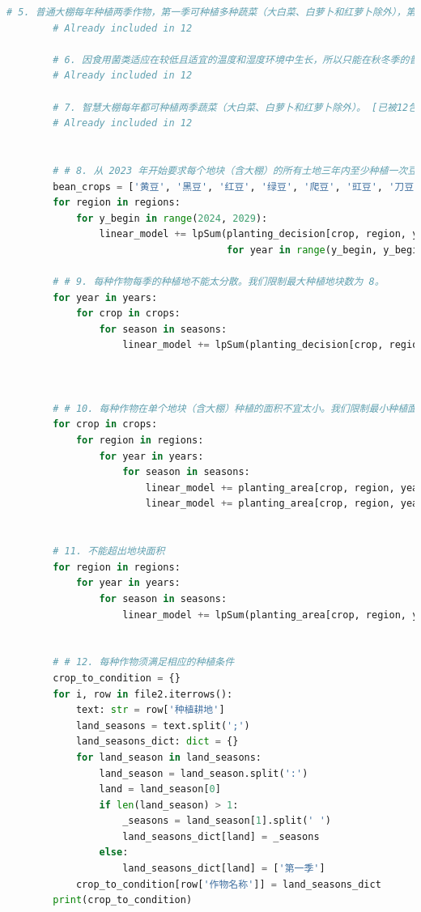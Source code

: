 \documentclass[withoutpreface]{cumcmthesis}
\begin{document}
\begin{appendices}
\begin{lstlisting}[language=python]
        # 5. 普通大棚每年种植两季作物，第一季可种植多种蔬菜（大白菜、白萝卜和红萝卜除外），第二季只能种植食用菌。[已被12包含]
        # Already included in 12
    
        # 6. 因食用菌类适应在较低且适宜的温度和湿度环境中生长，所以只能在秋冬季的普通大棚里种植。 [已被12包含]
        # Already included in 12
    
        # 7. 智慧大棚每年都可种植两季蔬菜（大白菜、白萝卜和红萝卜除外）。 [已被12包含]
        # Already included in 12
    
    
        # # 8. 从 2023 年开始要求每个地块（含大棚）的所有土地三年内至少种植一次豆类作物。
        bean_crops = ['黄豆', '黑豆', '红豆', '绿豆', '爬豆', '豇豆', '刀豆', '芸豆']
        for region in regions:
            for y_begin in range(2024, 2029):
                linear_model += lpSum(planting_decision[crop, region, year, season] for crop in bean_crops 
                                      for year in range(y_begin, y_begin + 3) for season in seasons) >= 1
    
        # # 9. 每种作物每季的种植地不能太分散。我们限制最大种植地块数为 8。
        for year in years:
            for crop in crops:
                for season in seasons:
                    linear_model += lpSum(planting_decision[crop, region, year, season] for region in regions) <= 8
    
    
    
        # # 10. 每种作物在单个地块（含大棚）种植的面积不宜太小。我们限制最小种植面积为 30%。
        for crop in crops:
            for region in regions:
                for year in years:
                    for season in seasons:
                        linear_model += planting_area[crop, region, year, season] >= 0.3 * region_areas[region] * planting_decision[crop, region, year, season]
                        linear_model += planting_area[crop, region, year, season] <= region_areas[region] * planting_decision[crop, region, year, season]
    
    
        # 11. 不能超出地块面积
        for region in regions:
            for year in years:
                for season in seasons:
                    linear_model += lpSum(planting_area[crop, region, year, season] for crop in crops) <= region_areas[region]
    
    
        # # 12. 每种作物须满足相应的种植条件
        crop_to_condition = {}
        for i, row in file2.iterrows():
            text: str = row['种植耕地']
            land_seasons = text.split(';')
            land_seasons_dict: dict = {}
            for land_season in land_seasons:
                land_season = land_season.split(':')
                land = land_season[0]
                if len(land_season) > 1:
                    _seasons = land_season[1].split(' ')
                    land_seasons_dict[land] = _seasons
                else:
                    land_seasons_dict[land] = ['第一季']
            crop_to_condition[row['作物名称']] = land_seasons_dict
        print(crop_to_condition)
    

\end{lstlisting}
\end{appendices}
\end{document}
